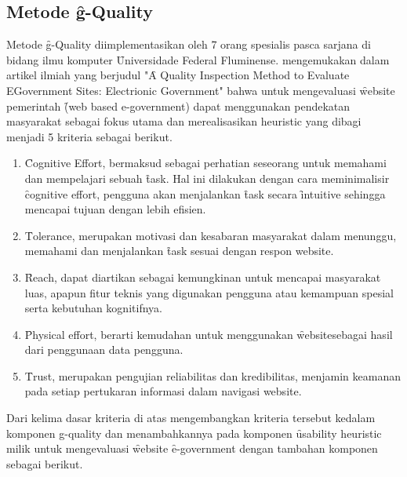 \subsection{Metode \f{g-Quality}}\label{subsec:gquality}
Metode \f{g-Quality} diimplementasikan oleh 7 orang spesialis pasca sarjana di bidang ilmu komputer \f{Universidade Federal Fluminense}. \citet{paper.garcia} mengemukakan dalam artikel ilmiah yang berjudul "\f{A Quality Inspection Method to Evaluate EGovernment Sites: Electrionic Government}" bahwa untuk mengevaluasi \f{website} pemerintah \f{(web based e-government)} dapat menggunakan pendekatan masyarakat sebagai fokus utama dan merealisasikan heuristic yang dibagi menjadi 5 kriteria sebagai berikut.
\begin{enumerate}
	\item \f{Cognitive Effort}, bermaksud sebagai perhatian seseorang untuk memahami dan mempelajari sebuah \f{task}. Hal ini dilakukan dengan cara meminimalisir \f{cognitive effort}, pengguna akan menjalankan \f{task} secara \f{intuitive} sehingga mencapai tujuan dengan lebih efisien. 
	\item \f{Tolerance}, merupakan motivasi dan kesabaran masyarakat dalam menunggu, memahami dan menjalankan \f{task} sesuai dengan respon website.
	\item \f{Reach}, dapat diartikan sebagai kemungkinan untuk mencapai masyarakat luas, apapun fitur teknis yang digunakan pengguna atau kemampuan spesial serta kebutuhan kognitifnya. 
	\item \f{Physical effort}, berarti kemudahan untuk menggunakan \f{website}sebagai hasil dari penggunaan data pengguna.
	\item \f{Trust}, merupakan pengujian reliabilitas dan kredibilitas, menjamin keamanan pada setiap pertukaran informasi dalam navigasi website.
\end{enumerate}
Dari kelima dasar kriteria di atas \citet{paper.garcia} mengembangkan kriteria tersebut kedalam komponen g-quality dan menambahkannya pada komponen \f{usability heuristic} milik \citeauthor{article.nielsen} untuk mengevaluasi \f{website} \f{e-government} dengan tambahan komponen sebagai berikut.
